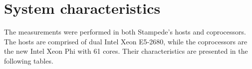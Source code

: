 \documentclass[abstract=on,9pt,twocolumn]{scrartcl}
\begin{document}
  




  




\section{System characteristics}

The measurements were performed in both Stampede's hosts and
coprocessors.
The hosts are comprised of dual Intel Xeon E5-2680, while the
coprocessors are the new Intel Xeon Phi with 61 cores. Their
characteristics are presented in the following tables.
\end{document}
